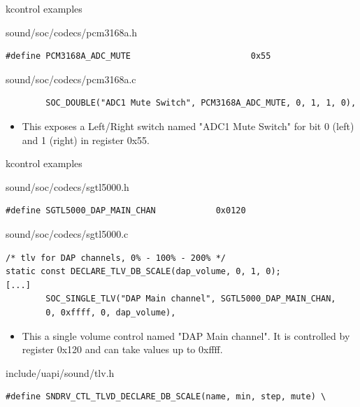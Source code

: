 \begin{frame}[fragile]{kcontrol examples}
  \begin{block}{sound/soc/codecs/pcm3168a.h}
    \fontsize{9}{9}\selectfont
    \begin{verbatim}
#define PCM3168A_ADC_MUTE                        0x55
    \end{verbatim}
  \end{block}
  \begin{block}{sound/soc/codecs/pcm3168a.c}
    \fontsize{9}{9}\selectfont
    \begin{verbatim}
        SOC_DOUBLE("ADC1 Mute Switch", PCM3168A_ADC_MUTE, 0, 1, 1, 0),
    \end{verbatim}
  \end{block}
  \begin{itemize}
  \item This exposes a Left/Right switch named "ADC1 Mute Switch" for
    bit 0 (left) and 1 (right) in register 0x55.
  \end{itemize}
\end{frame}


\begin{frame}[fragile]{kcontrol examples}
  \begin{block}{sound/soc/codecs/sgtl5000.h}
    \fontsize{9}{9}\selectfont
    \begin{verbatim}
#define SGTL5000_DAP_MAIN_CHAN            0x0120
    \end{verbatim}
  \end{block}
  \begin{block}{sound/soc/codecs/sgtl5000.c}
    \fontsize{9}{9}\selectfont
    \begin{verbatim}
/* tlv for DAP channels, 0% - 100% - 200% */
static const DECLARE_TLV_DB_SCALE(dap_volume, 0, 1, 0);
[...]
        SOC_SINGLE_TLV("DAP Main channel", SGTL5000_DAP_MAIN_CHAN,
        0, 0xffff, 0, dap_volume),
    \end{verbatim}
  \end{block}
  \begin{itemize}
  \item This a single volume control named "DAP Main channel".
    It is controlled by register 0x120 and can take values up to
    0xffff.
  \end{itemize}
  \begin{block}{include/uapi/sound/tlv.h}
    \fontsize{9}{9}\selectfont
    \begin{verbatim}
#define SNDRV_CTL_TLVD_DECLARE_DB_SCALE(name, min, step, mute) \
    \end{verbatim}
  \end{block}
\end{frame}


